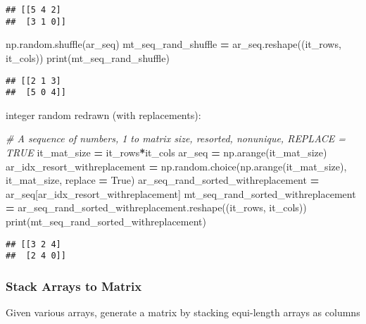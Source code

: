 \documentclass[
]{book}
\newenvironment{Shaded}{\begin{snugshade}}{\end{snugshade}}
\newcommand{\BuiltInTok}[1]{#1}
\newcommand{\CommentTok}[1]{\textcolor[rgb]{0.56,0.35,0.01}{\textit{#1}}}
\newcommand{\NormalTok}[1]{#1}
\newcommand{\OperatorTok}[1]{\textcolor[rgb]{0.81,0.36,0.00}{\textbf{#1}}}
\newcommand{\VariableTok}[1]{\textcolor[rgb]{0.00,0.00,0.00}{#1}}
\begin{document}
\begin{verbatim}
## [[5 4 2]
##  [3 1 0]]
\end{verbatim}

\begin{Shaded}
\begin{Highlighting}[]
\NormalTok{np.random.shuffle(ar_seq)}
\NormalTok{mt_seq_rand_shuffle }\OperatorTok{=}\NormalTok{ ar_seq.reshape((it_rows, it_cols))}
\BuiltInTok{print}\NormalTok{(mt_seq_rand_shuffle)}
\end{Highlighting}
\end{Shaded}

\begin{verbatim}
## [[2 1 3]
##  [5 0 4]]
\end{verbatim}

integer random redrawn (with replacements):

\begin{Shaded}
\begin{Highlighting}[]
\CommentTok{# A sequence of numbers, 1 to matrix size, resorted, nonunique, REPLACE = TRUE}
\NormalTok{it_mat_size }\OperatorTok{=}\NormalTok{ it_rows}\OperatorTok{*}\NormalTok{it_cols}
\NormalTok{ar_seq }\OperatorTok{=}\NormalTok{ np.arange(it_mat_size)}
\NormalTok{ar_idx_resort_withreplacement }\OperatorTok{=}\NormalTok{ np.random.choice(np.arange(it_mat_size), it_mat_size, replace }\OperatorTok{=} \VariableTok{True}\NormalTok{)}
\NormalTok{ar_seq_rand_sorted_withreplacement }\OperatorTok{=}\NormalTok{ ar_seq[ar_idx_resort_withreplacement]}
\NormalTok{mt_seq_rand_sorted_withreplacement }\OperatorTok{=}\NormalTok{ ar_seq_rand_sorted_withreplacement.reshape((it_rows, it_cols))}
\BuiltInTok{print}\NormalTok{(mt_seq_rand_sorted_withreplacement)}
\end{Highlighting}
\end{Shaded}

\begin{verbatim}
## [[3 2 4]
##  [2 4 0]]
\end{verbatim}

\hypertarget{stack-arrays-to-matrix}{%
\subsubsection{Stack Arrays to Matrix}\label{stack-arrays-to-matrix}}

Given various arrays, generate a matrix by stacking equi-length arrays as columns
\end{document}
